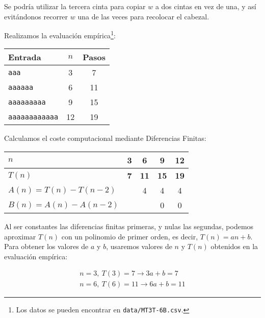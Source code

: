 Se podría utilizar la tercera cinta para copiar $w$ a dos cintas en vez de una, y así evitándonos recorrer $w$ una de las veces para recolocar el cabezal.


Realizamos la evaluación empírica\footnote{Los datos se pueden encontrar en \texttt{data/MT3T-6B.csv}.}:

\begin{table}[h]
    \centering
    \begin{tabular}{lcc}
        Entrada & $n$ & Pasos \\
        \hline
        \texttt{aaa}                &  3  &  7 \\
        \texttt{aaaaaa}             &  6  & 11 \\
        \texttt{aaaaaaaaa}          &  9  & 15 \\
        \texttt{aaaaaaaaaaaa}       & 12  & 19 \\
    \end{tabular}
\end{table}

Calculamos el coste computacional mediante Diferencias Finitas:

\begin{table}[H]
    \centering
    \begin{tabular}{|l|c|c|c|c|}
        \hline
        $n$    & \textbf{3} & \textbf{6}  & \textbf{9}  & \textbf{12} \\ \hline
        $T(n)$ & \textbf{7} & \textbf{11} & \textbf{15} & \textbf{19} \\ \hline
        \hline
        $A(n) = T(n) - T(n-2)$ &   & 4 & 4 & 4 \\ \hline
        $B(n) = A(n) - A(n-2)$ &   &   & 0 & 0 \\ \hline
    \end{tabular}
\end{table}

Al ser constantes las diferencias finitas primeras, y nulas las segundas, podemos aproximar $T(n)$ con un polinomio de primer orden, es decir, $T(n) = an + b$.\\

Para obtener los valores de $a$ y $b$, usaremos valores de $n$ y $T(n)$ obtenidos en la evaluación empírica:

\begin{subequations}
    \begin{gather}
        n = 3,\ T(3) = 7 \rightarrow 3a + b = 7 \\
        n = 6,\ T(6) = 11 \rightarrow 6a + b = 11
    \end{gather}
\end{subequations}

